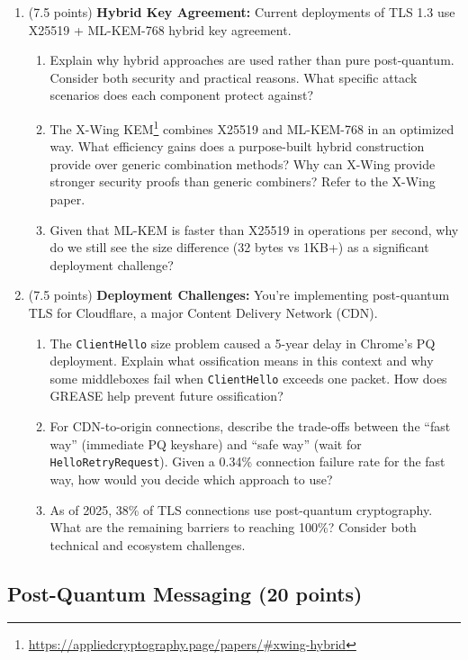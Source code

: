 \documentclass[10pt,a4paper,american]{article}
\begin{document}
\begin{enumerate}
	\item (7.5 points) \textbf{Hybrid Key Agreement:}
	      Current deployments of TLS 1.3 use X25519 + ML-KEM-768 hybrid key agreement.
	      \begin{enumerate}
		      \item Explain why hybrid approaches are used rather than pure post-quantum. Consider both security and practical reasons. What specific attack scenarios does each component protect against?
		      \item The X-Wing KEM\footnote{\url{https://appliedcryptography.page/papers/\#xwing-hybrid}} combines X25519 and ML-KEM-768 in an optimized way. What efficiency gains does a purpose-built hybrid construction provide over generic combination methods? Why can X-Wing provide stronger security proofs than generic combiners? Refer to the X-Wing paper.
		      \item Given that ML-KEM is faster than X25519 in operations per second, why do we still see the size difference (32 bytes vs 1KB+) as a significant deployment challenge?
	      \end{enumerate}
	\item (7.5 points) \textbf{Deployment Challenges:}
	      You're implementing post-quantum TLS for Cloudflare, a major Content Delivery Network (CDN).
	      \begin{enumerate}
		      \item The \texttt{ClientHello} size problem caused a 5-year delay in Chrome's PQ deployment. Explain what ossification means in this context and why some middleboxes fail when \texttt{ClientHello} exceeds one packet. How does GREASE help prevent future ossification?
		      \item For CDN-to-origin connections, describe the trade-offs between the ``fast way'' (immediate PQ keyshare) and ``safe way'' (wait for \texttt{HelloRetryRequest}). Given a 0.34\% connection failure rate for the fast way, how would you decide which approach to use?
		      \item As of 2025, 38\% of TLS connections use post-quantum cryptography. What are the remaining barriers to reaching 100\%? Consider both technical and ecosystem challenges.
	      \end{enumerate}
\end{enumerate}

\subsection{Post-Quantum Messaging (20 points)}
\end{document}
